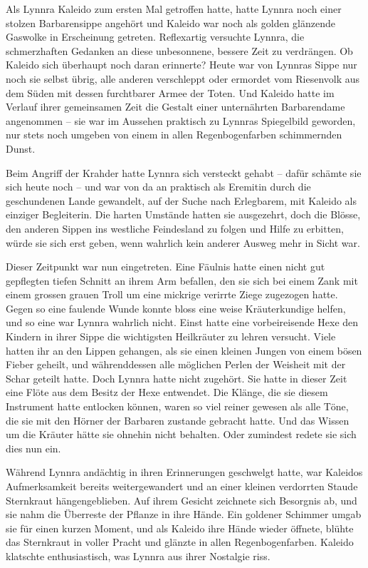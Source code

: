 \documentclass[10pt, a4paper, oneside]{book}
\begin{document}
Als Lynnra Kaleido zum ersten Mal getroffen hatte, hatte Lynnra noch einer stolzen Barbarensippe angehört und Kaleido war noch als golden glänzende Gaswolke in Erscheinung getreten. Reflexartig versuchte Lynnra, die schmerzhaften Gedanken an diese unbesonnene, bessere Zeit zu verdrängen. Ob Kaleido sich überhaupt noch daran erinnerte? Heute war von Lynnras Sippe nur noch sie selbst übrig, alle anderen verschleppt oder ermordet vom Riesenvolk aus dem Süden mit dessen furchtbarer Armee der Toten. Und Kaleido hatte im Verlauf ihrer gemeinsamen Zeit die Gestalt einer unternährten Barbarendame angenommen – sie war im Aussehen praktisch zu Lynnras Spiegelbild geworden, nur stets noch umgeben von einem in allen Regenbogenfarben schimmernden Dunst.



Beim Angriff der Krahder hatte Lynnra sich versteckt gehabt – dafür schämte sie sich heute noch – und war von da an praktisch als Eremitin durch die geschundenen Lande gewandelt, auf der Suche nach Erlegbarem, mit Kaleido als einziger Begleiterin. Die harten Umstände hatten sie ausgezehrt, doch die Blösse, den anderen Sippen ins westliche Feindesland zu folgen und Hilfe zu erbitten, würde sie sich erst geben, wenn wahrlich kein anderer Ausweg mehr in Sicht war.



Dieser Zeitpunkt war nun eingetreten. Eine Fäulnis hatte einen nicht gut gepflegten tiefen Schnitt an ihrem Arm befallen, den sie sich bei einem Zank mit einem grossen grauen Troll um eine mickrige verirrte Ziege zugezogen hatte. Gegen so eine faulende Wunde konnte bloss eine weise Kräuterkundige helfen, und so eine war Lynnra wahrlich nicht. Einst hatte eine vorbeireisende Hexe den Kindern in ihrer Sippe die wichtigsten Heilkräuter zu lehren versucht. Viele hatten ihr an den Lippen gehangen, als sie einen kleinen Jungen von einem bösen Fieber geheilt, und währenddessen alle möglichen Perlen der Weisheit mit der Schar geteilt hatte. Doch Lynnra hatte nicht zugehört. Sie hatte in dieser Zeit eine Flöte aus dem Besitz der Hexe entwendet. Die Klänge, die sie diesem Instrument hatte entlocken können, waren so viel reiner gewesen als alle Töne, die sie mit den Hörner der Barbaren zustande gebracht hatte. Und das Wissen um die Kräuter hätte sie ohnehin nicht behalten. Oder zumindest redete sie sich dies nun ein.



Während Lynnra andächtig in ihren Erinnerungen geschwelgt hatte, war Kaleidos Aufmerksamkeit bereits weitergewandert und an einer kleinen verdorrten Staude Sternkraut hängengeblieben. Auf ihrem Gesicht zeichnete sich Besorgnis ab, und sie nahm die Überreste der Pflanze in ihre Hände. Ein goldener Schimmer umgab sie für einen kurzen Moment, und als Kaleido ihre Hände wieder öffnete, blühte das Sternkraut in voller Pracht und glänzte in allen Regenbogenfarben. Kaleido klatschte enthusiastisch, was Lynnra aus ihrer Nostalgie riss.
\end{document}
